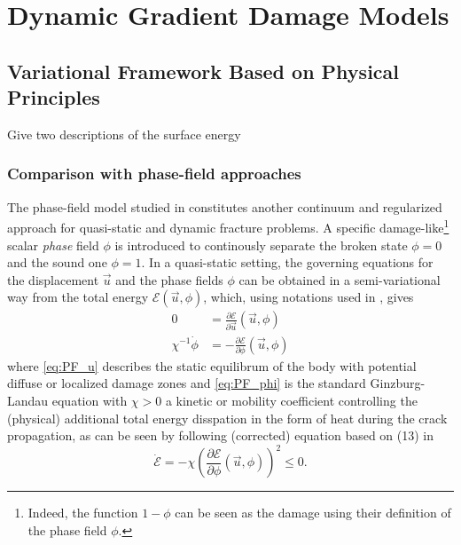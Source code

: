 \chapter{Dynamic Gradient Damage Models}
\minitoc

\section{Variational Framework Based on Physical Principles} \label{sec:formulation}
Give two descriptions of the surface energy

\subsection{Comparison with phase-field approaches} \label{sec:phasefields}
The phase-field model studied in \cite{KarmaKesslerLevine:2001,HakimKarma:2009} constitutes another continuum and regularized approach for quasi-static and dynamic fracture problems. A specific damage-like\footnote{Indeed, the function $1-\phi$ can be seen as the damage using their definition of the phase field $\phi$.} scalar \emph{phase} field $\phi$ is introduced to continously separate the broken state $\phi=0$ and the sound one $\phi=1$. In a quasi-static setting, the governing equations for the displacement $\vec{u}$ and the phase fields $\phi$ can be obtained in a semi-variational way from the total energy $\mathcal{E}(\vec{u},\phi)$, which, using notations used in \cite{HakimKarma:2009}, gives
\begin{align}
0 &= \frac{\partial\mathcal{E}}{\partial\vec{u}}(\vec{u},\phi) \label{eq:PF_u} \\
\chi^{-1}\dot{\phi} &= -\frac{\partial\mathcal{E}}{\partial\phi}(\vec{u},\phi) \label{eq:PF_phi}
\end{align}
where \eqref{eq:PF_u} describes the static equilibrum of the body with potential diffuse or localized damage zones and \eqref{eq:PF_phi} is the standard Ginzburg-Landau equation with $\chi>0$ a kinetic or mobility \cite{KuhnMuller:2010} coefficient controlling the (physical) additional total energy disspation in the form of heat during the crack propagation, as can be seen by following (corrected) equation based on (13) in \cite{HakimKarma:2009}
\begin{equation} \label{eq:PF_dissipation}
\dot{\mathcal{E}}=-\chi\left(\frac{\partial\mathcal{E}}{\partial\phi}(\vec{u},\phi)\right)^2\leq 0.
\end{equation}

